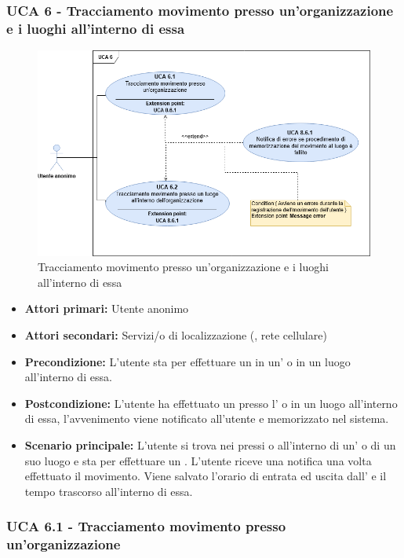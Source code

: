 \subsubsection{UCA 6 - Tracciamento movimento presso un'organizzazione e i luoghi all'interno di essa}%

\begin{figure}[h]
	\centering
	\includegraphics[scale=0.4, center]{Sezioni/UseCase/Immagini/UCA6.png}
	\caption{Tracciamento movimento presso un’organizzazione e i luoghi all’interno di essa}
\end{figure}

\begin{itemize}
	\item \textbf{Attori primari:} Utente anonimo
	\item \textbf{Attori secondari:} Servizi/o di localizzazione (, rete cellulare)
	\item \textbf{Precondizione:} L'utente sta per effettuare un  in un' o in un luogo all'interno di essa.
	\item \textbf{Postcondizione:} L'utente ha effettuato un  presso l' o in un luogo all'interno di essa, l'avvenimento viene notificato all'utente e memorizzato nel sistema. 
	\item \textbf{Scenario principale:} L'utente si trova nei pressi o all'interno di un' o di un suo luogo e sta per effettuare un . L'utente riceve una notifica una volta effettuato il movimento. Viene salvato l'orario di entrata ed uscita dall' e il tempo trascorso all'interno di essa.
\end{itemize}

\subsubsection{UCA 6.1 - Tracciamento movimento presso un'organizzazione}

